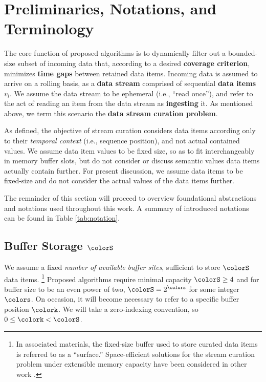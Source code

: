 \section{Preliminaries, Notations, and Terminology} \label{sec:notation}

The core function of proposed algorithms is to dynamically filter out a bounded-size subset of incoming data that, according to a desired \textbf{coverage criterion}, minimizes \textbf{time gaps} between retained data items.
Incoming data is assumed to arrive on a rolling basis, as a \textbf{data stream} comprised of sequential \textbf{data items} $v_i$.
We assume the data stream to be ephemeral (i.e., ``read once''), and refer to the act of reading an item from the data stream as \textbf{ingesting} it.
As mentioned above, we term this scenario the \textbf{data stream curation problem}.

As defined, the objective of stream curation considers data items according only to their \textit{temporal context} (i.e., sequence position), and not actual contained values.
We assume data item values to be fixed size, so as to fit interchangeably in memory buffer slots, but do not consider or discuss semantic values data items actually contain further.
For present discussion, we assume data items to be fixed-size and do not consider the actual values of the data items further.

The remainder of this section will proceed to overview foundational abstractions and notations used throughout this work.
A summary of introduced notations can be found in Table \ref{tab:notation}.



\subsection{Buffer Storage $\colorS$}
\label{sec:notation-buffer}

We assume a fixed \textit{number of available buffer sites}, sufficient to store $\colorS$ data items.%
\footnote{%
In associated materials, the fixed-size buffer used to store curated data items is referred to as a ``surface.''
Space-efficient solutions for the stream curation problem under extensible memory capacity have been considered in other work \citep{moreno2024algorithms}.%
}
Proposed algorithms require minimal capacity $\colorS\geq4$ and for buffer size to be an even power of two, $\colorS = 2^{\colors}$ for some integer $\colors$.
On occasion, it will become necessary to refer to a specific buffer position $\colork$.
We will take a zero-indexing convention, so $0 \leq \colork < \colorS$.


